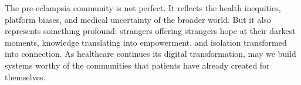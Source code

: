 \documentclass[12pt, a4paper]{article}
\begin{document}
The pre-eclampsia community is not perfect. It reflects the health inequities, platform biases, and medical uncertainty of the broader world. But it also represents something profound: strangers offering strangers hope at their darkest moments, knowledge translating into empowerment, and isolation transformed into connection. As healthcare continues its digital transformation, may we build systems worthy of the communities that patients have already created for themselves.


% 
\end{document}
